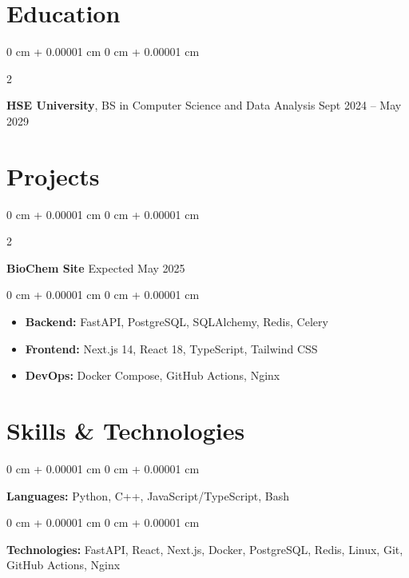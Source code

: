 \documentclass[10pt, letterpaper]{article}
\newenvironment{highlights}{
    \begin{itemize}[
        topsep=0.10 cm,
        parsep=0.10 cm,
        partopsep=0pt,
        itemsep=0pt,
        leftmargin=0 cm + 10pt
    ]
}{
    \end{itemize}
} %
\newenvironment{onecolentry}{
    \begin{adjustwidth}{
        0 cm + 0.00001 cm
    }{
        0 cm + 0.00001 cm
    }
}{
    \end{adjustwidth}
} %
\newenvironment{twocolentry}[2][]{
    \onecolentry
    \def\secondColumn{#2}
    \setcolumnwidth{\fill, 4.5 cm}
    \begin{paracol}{2}
}{
    \switchcolumn \raggedleft \secondColumn
    \end{paracol}
    \endonecolentry
} %
\begin{document}
    
    \section{Education}



        
        \begin{twocolentry}{
            Sept 2024 – May 2029
        }
            \textbf{HSE University}, BS in Computer Science and Data Analysis\end{twocolentry}



    
    \section{Projects}



        
        \begin{twocolentry}{
            Expected May 2025
        }
            \textbf{BioChem Site}\end{twocolentry}

        \vspace{0.10 cm}
        \begin{onecolentry}
            \begin{highlights}
                \item \textbf{Backend:} FastAPI, PostgreSQL, SQLAlchemy, Redis, Celery
                \item \textbf{Frontend:} Next.js 14, React 18, TypeScript, Tailwind CSS
                \item \textbf{DevOps:} Docker Compose, GitHub Actions, Nginx
            \end{highlights}
        \end{onecolentry}



    
    \section{Skills \& Technologies}



        
        \begin{onecolentry}
            \textbf{Languages:} Python, C++, JavaScript/TypeScript, Bash
        \end{onecolentry}

        \vspace{0.2 cm}

        \begin{onecolentry}
            \textbf{Technologies:} FastAPI, React, Next.js, Docker, PostgreSQL, Redis, Linux, Git, GitHub Actions, Nginx
        \end{onecolentry}
\end{document}
